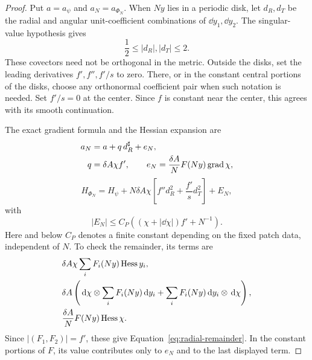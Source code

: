 \begin{proof}
Put $a=a_\psi$ and $a_N=a_{\Phi_N}$.  When $Ny$ lies in a periodic disk,
let $d_R,d_T$ be the radial and angular unit-coefficient combinations of
$\dd y_1,\dd y_2$.  The singular-value hypothesis gives
\[
 \frac12\le |d_R|,|d_T|\le2.
\]
These covectors need not be orthogonal in the metric.  Outside the disks,
set the leading derivatives $f',f'',f'/s$ to zero.  There, or in the
constant central portions of the disks, choose any orthonormal coefficient
pair when such notation is needed.  Set $f'/s=0$ at the center.  Since $f$
is constant near the center, this agrees with its smooth continuation.

The exact gradient formula and the Hessian expansion are
\begin{equation}
 \begin{aligned}
 a_N&=a+q\,d_R^\sharp+e_N,\\
 q&=\delta A\chi f',\qquad
 e_N=\frac{\delta A}{N}F(Ny)\operatorname{grad}\chi,
 \end{aligned}
 \label{eq:radial-gradient}
\end{equation}
\begin{equation}
 H_{\Phi_N}
 =H_\psi+N\delta A\chi
       \left[f''d_R^2+\frac{f'}s d_T^2\right]+E_N,
 \label{eq:radial-hessian}
\end{equation}
with
\begin{equation}
 |E_N|\le C_P\left((\chi+|\dd\chi|)f'+N^{-1}\right).
 \label{eq:radial-remainder}
\end{equation}
Here and below $C_P$ denotes a finite constant depending on the fixed
patch data, independent of $N$.  To check the remainder, its terms are
\begin{align*}
 &\delta A\chi\sum_i F_i(Ny)\operatorname{Hess} y_i,\\
 &\delta A\left(\,\mathrm d\chi\otimes\sum_i F_i(Ny)\,\mathrm d y_i
       +\sum_i F_i(Ny)\,\mathrm d y_i\otimes\,\mathrm d\chi\right),\\
 &\frac{\delta A}{N}F(Ny)\operatorname{Hess}\chi.
\end{align*}
Since $|(F_1,F_2)|=f'$, these give
Equation~\eqref{eq:radial-remainder}.  In the constant portions of $F$,
its value contributes only to $e_N$ and to the last displayed term.


\end{proof}
